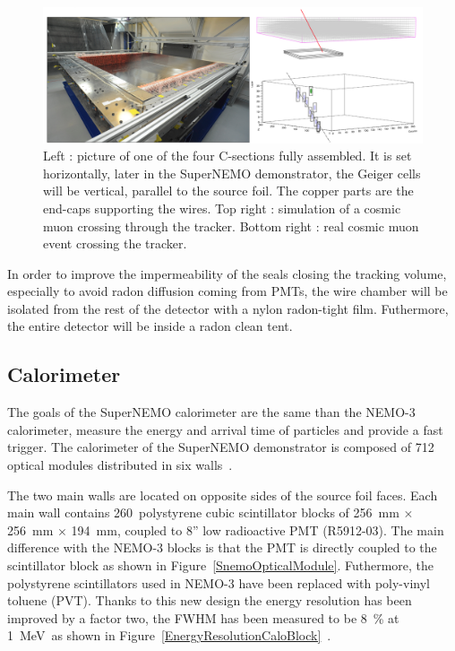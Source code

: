 \documentclass[main.tex]{subfiles}
\begin{document}
\begin{figure}[h!]
\begin{center}
\includegraphics[scale=0.25]{pictures/Chap3/TrackerTestCosmic.png}
\caption{Left : picture of one of the four C-sections fully assembled. It is set horizontally, later in the SuperNEMO demonstrator, the Geiger cells will be vertical, parallel to the source foil. The copper parts are the end-caps supporting the wires. Top right : simulation of a cosmic muon crossing through the tracker. Bottom right : real cosmic muon event crossing the tracker.}
\label{SnemoTracker}
\end{center}
\end{figure}


\NI In order to improve the impermeability of the seals closing the tracking volume, especially to avoid radon diffusion coming from PMTs, the wire chamber will be isolated from the rest of the detector with a nylon radon-tight film. Futhermore, the entire detector will be inside a radon clean tent.


\FloatBarrier


\subsection{Calorimeter}


\NI The goals of the SuperNEMO calorimeter are the same than the NEMO-3 calorimeter, measure the energy and arrival time of particles and provide a fast trigger. The calorimeter of the SuperNEMO demonstrator is composed of 712 optical modules distributed in six walls~\cite{SNCalorimeter}.


\bigskip


\NI The two main walls are located on opposite sides of the source foil faces. Each main wall contains 260~polystyrene cubic scintillator blocks of 256~mm $\times$ 256~mm $\times$ 194~mm, coupled to 8'' low radioactive PMT (R5912-03). The main difference with the NEMO-3 blocks is that the PMT is directly coupled to the scintillator block as shown in Figure~\ref{SnemoOpticalModule}. Futhermore, the polystyrene scintillators used in NEMO-3 have been replaced with poly-vinyl toluene (PVT). Thanks to this new design the energy resolution has been improved by a factor two, the FWHM has been measured to be 8~\% at 1~MeV~as shown in Figure~\ref{EnergyResolutionCaloBlock}~\cite{SNCalorimeter}.
\end{document}
